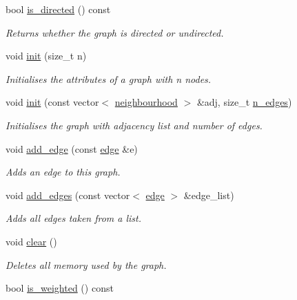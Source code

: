 \begin{DoxyCompactItemize}
bool \hyperlink{classlgraph_1_1utils_1_1uugraph_a20a86c5b56527e8abcbb90bae95d6605}{is\-\_\-directed} () const 
\begin{DoxyCompactList}\small\item\em Returns whether the graph is directed or undirected. \end{DoxyCompactList}\item 
void \hyperlink{classlgraph_1_1utils_1_1uxgraph_ab1e7ab39be6e8ca6149eef47dd51b155}{init} (size\-\_\-t n)
\begin{DoxyCompactList}\small\item\em Initialises the attributes of a graph with {\itshape n} nodes. \end{DoxyCompactList}\item 
void \hyperlink{classlgraph_1_1utils_1_1uxgraph_ac93cb68bbc1d9c30cb33114cb449bb0a}{init} (const vector$<$ \hyperlink{namespacelgraph_1_1utils_a0f2ef47028a466d26841709e705390ac}{neighbourhood} $>$ \&adj, size\-\_\-t \hyperlink{classlgraph_1_1utils_1_1xxgraph_af3f7c3835406c2cbf70479ae1c0253c9}{n\-\_\-edges})
\begin{DoxyCompactList}\small\item\em Initialises the graph with adjacency list and number of edges. \end{DoxyCompactList}\item 
void \hyperlink{classlgraph_1_1utils_1_1uxgraph_a46e24b0e3208accb9e726db2877320e1}{add\-\_\-edge} (const \hyperlink{namespacelgraph_1_1utils_a6510284ce1b1ae5dc97ce5d2de426e10}{edge} \&e)
\begin{DoxyCompactList}\small\item\em Adds an edge to this graph. \end{DoxyCompactList}\item 
void \hyperlink{classlgraph_1_1utils_1_1uxgraph_af6f7c0a2dc67706a07bd58f06b3dcf9f}{add\-\_\-edges} (const vector$<$ \hyperlink{namespacelgraph_1_1utils_a6510284ce1b1ae5dc97ce5d2de426e10}{edge} $>$ \&edge\-\_\-list)
\begin{DoxyCompactList}\small\item\em Adds all edges taken from a list. \end{DoxyCompactList}\item 
void \hyperlink{classlgraph_1_1utils_1_1uxgraph_ae76c83683dc7527fe5394d67437a7107}{clear} ()
\begin{DoxyCompactList}\small\item\em Deletes all memory used by the graph. \end{DoxyCompactList}\item 
\hypertarget{classlgraph_1_1utils_1_1uxgraph_ae1c3f40bb80ab20c2de96735ccde7b3f}{bool \hyperlink{classlgraph_1_1utils_1_1uxgraph_ae1c3f40bb80ab20c2de96735ccde7b3f}{is\-\_\-weighted} () const }\label{classlgraph_1_1utils_1_1uxgraph_ae1c3f40bb80ab20c2de96735ccde7b3f}


\end{DoxyCompactItemize}
